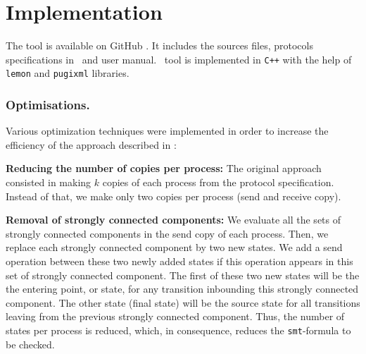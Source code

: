 \section{Implementation}
\label{sec:optim}

The tool is available on GitHub \cite{github.MPass}.
It includes the sources files, protocols specifications in \xml\ and user manual.
%
\MPass\ tool is implemented in \texttt{C++} with the help of \texttt{lemon} and \texttt{pugixml} libraries.

\subsubsection{Optimisations.}

Various optimization techniques were implemented in order to increase the efficiency of the approach described in  \cite{AAC13}:

\begin{description}
\item{\textbf{Reducing the number of copies per process:}}
The original approach consisted in making $k$ copies of each process from the protocol specification.
Instead of that, we make only two copies per process (send and receive copy).
%
\item{\textbf{Removal of strongly connected components:}}
We evaluate all the sets of strongly connected components in the send copy of each process. 
Then, we replace each strongly connected component by two new states.
We add a send operation between these two newly added states if this operation appears in this set of strongly connected component.
The first of these two new states will be the the entering point, or state, for any transition inbounding this strongly connected component.
The other state (final state) will be  the source state for all transitions leaving from the previous strongly connected component.
Thus, the number of states per process is reduced, which, in consequence, reduces the \texttt{smt}-formula to be checked.
\end{description}
